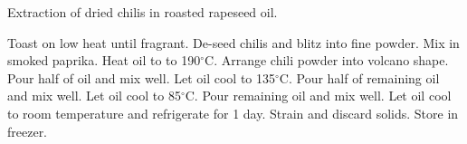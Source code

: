 \documentclass[main]{subfiles}
\begin{document}
Extraction of dried chilis in roasted rapeseed oil.

\begin{rec}
Toast on low heat until fragrant.
De-seed chilis and blitz into fine powder.
Mix in smoked paprika.
Heat oil to to 190$^\circ$C.
Arrange chili powder into volcano shape.
\newstep
Pour half of oil and mix well.
\newstep
Let oil cool to 135$^\circ$C. Pour half of remaining oil and mix well.
\newstep
Let oil cool to 85$^\circ$C. Pour remaining oil and mix well.
\newstep
Let oil cool to room temperature and refrigerate for 1 day. Strain and discard solids. Store in freezer.
\end{rec}

\end{document}
